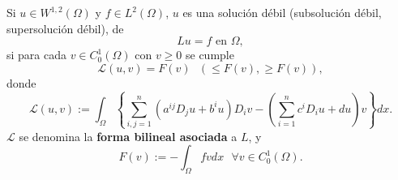 \begin{definition}
Si $u\in W^{1,2}(\Omega)$ y $f\in L^{2}\left(  \Omega\right)  $, $u$ es una
soluci\'{o}n d\'{e}bil (subsoluci\'{o}n d\'{e}bil, supersoluci\'{o}n
d\'{e}bil), de
\[
Lu=f\text{ \ \ en }\Omega,
\]
si para cada $v\in C_{0}^{1}\left(  \Omega\right)  $ con $v\geq0$ se cumple
\begin{equation}
\mathcal{L}\left(  u,v\right)  =F\left(  v\right)  \text{ \ }\left(  \leq
F\left(  v\right)  ,\geq F\left(  v\right)  \right)  ,\tag{5}%
\end{equation}
donde
\begin{equation}
\mathcal{L}\left(  u,v\right)  :=\int_{\Omega}\left\{  \sum_{i,j=1}^{n}\left(
a^{ij}D_{j}u+b^{i}u\right)  D_{i}v-\left(  \sum_{i=1}^{n}c^{i}D_{i}%
u+du\right)  v\right\}  dx.\tag{6}%
\end{equation}
$\mathcal{L}$ se denomina la \textbf{forma bilineal asociada} a $L$, y
\begin{equation}
F\left(  v\right)  :=-\int_{\Omega}fvdx\text{ \ }\forall v\in C_{0}^{1}\left(
\Omega\right)  .\tag{7}%
\end{equation}

\end{definition}
